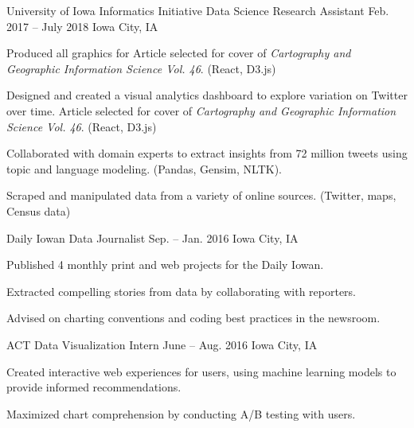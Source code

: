 \begin{cventries}
  \cventry
    {University of Iowa Informatics Initiative}
    {Data Science Research Assistant}
    {Feb. 2017 -- July 2018}
    {Iowa City, IA}
    {%
      \begin{cvitems}
        \item {Produced all graphics for Article selected for cover of \textit{Cartography and Geographic Information Science Vol. 46}. (React, D3.js)}
        \item {Designed and created a visual analytics dashboard to explore variation on Twitter over time. Article selected for cover of \textit{Cartography and Geographic Information Science Vol. 46}. (React, D3.js)}
        \item {Collaborated with domain experts to extract insights from 72 million tweets using topic and language modeling. (Pandas, Gensim, NLTK).}
        \item{Scraped and manipulated data from a variety of online sources. (Twitter, maps, Census data)}
      \end{cvitems}
    }

  \cventry
    {Daily Iowan}
    {Data Journalist}
    {Sep. -- Jan. 2016}
    {Iowa City, IA}
    {%
      \begin{cvitems}
        \item{Published 4 monthly print and web projects for the Daily Iowan.}
        \item{Extracted compelling stories from data by collaborating with reporters.}
        \item{Advised on charting conventions and coding best practices in the newsroom.}
      \end{cvitems}
    }

  \cventry
    {ACT}
    {Data Visualization Intern}
    {June -- Aug. 2016}
    {Iowa City, IA}
    {%
      \begin{cvitems}
        \item{Created interactive web experiences for users, using machine learning models to provide informed recommendations.}
        \item{Maximized chart comprehension by conducting A/B testing with users.}
      \end{cvitems}
    }
\end{cventries}
